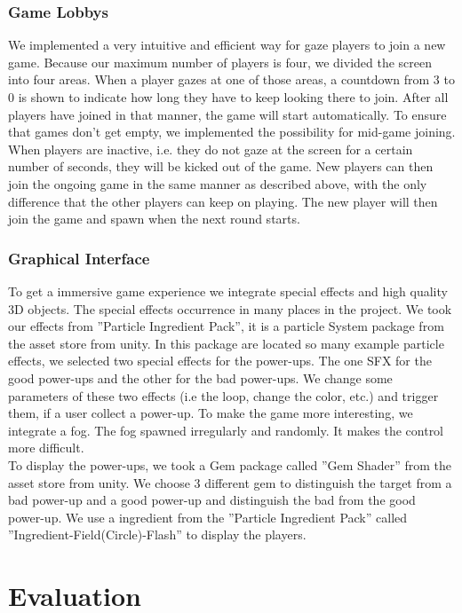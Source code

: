 \documentclass{sigchi}
\begin{document}
\subsubsection{Game Lobbys}
We implemented a very intuitive and efficient way for gaze players to join a new game. Because our maximum number of players is four, we divided the screen into four areas. When a player gazes at one of those areas, a countdown from 3 to 0 is shown to indicate how long they have to keep looking there to join. After all players have joined in that manner, the game will start automatically. To ensure that games don't get empty, we implemented the possibility for mid-game joining. When players are inactive, i.e. they do not gaze at the screen for a certain number of seconds, they will be kicked out of the game. New players can then join the ongoing game in the same manner as described above, with the only difference that the other players can keep on playing. The new player will then join the game and spawn when the next round starts.

\subsubsection{Graphical Interface} 
To get a immersive game experience we integrate special effects and high quality 3D objects. The special effects occurrence in many places in the project. We took our effects from ''Particle Ingredient Pack'', it is a particle System package from the asset store from unity. In this package are located so many example particle effects, we selected two special effects for the power-ups. The one SFX for the good power-ups and the other for the bad power-ups. We change some parameters of these two effects (i.e the loop, change the color, etc.) and trigger them, if a user collect a power-up. To make the game more interesting, we integrate a fog. The fog spawned irregularly and randomly. It makes the control more difficult.\\
To display the power-ups, we took a Gem package called ''Gem Shader'' from the asset store from unity. We choose 3 different gem to distinguish the target from a bad power-up and a good power-up and distinguish the bad from the good power-up. We use a ingredient from the ''Particle Ingredient Pack''  called ''Ingredient-Field(Circle)-Flash'' to display the players.


\section{Evaluation}
\end{document}
